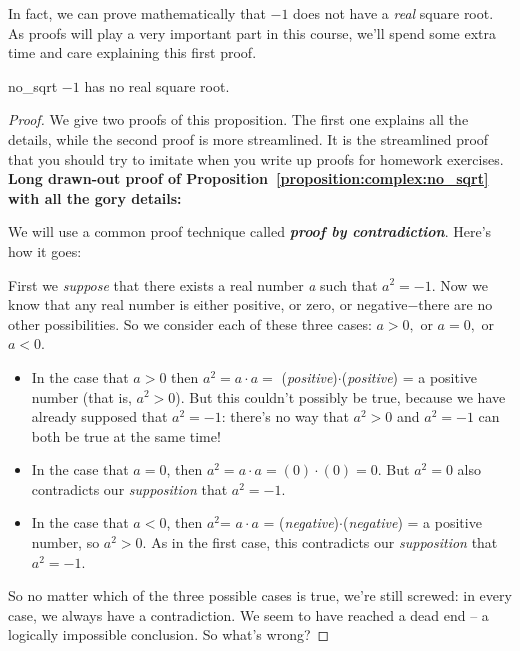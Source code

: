In fact, we can prove mathematically that $-1$ does not have a \emph{real} square root. As proofs will play a very important part in this course, we'll spend some extra time and care explaining this first proof.

\begin{prop}{no_sqrt} $-1$ has no real square root.
\end{prop}
\begin{proof}
We give two proofs of this proposition. The first one explains all
the details, while the second proof is more streamlined. It is the streamlined
proof that you should try to imitate when you write up proofs for
homework exercises.
\medskip{}
\newline
\noindent \textbf{Long drawn-out proof of Proposition~\ref{proposition:complex:no_sqrt} with all the gory details:} 

We will use a common proof technique called {\bf \emph{ proof by contradiction}}. 
Here's how it goes:

First we \emph{suppose} that there exists a real number \emph{a} such that
$a^{2}=-1$. Now we know that any real number is either positive, or zero, or negative$-$there are no other possibilities. So we consider each of these three cases: $a>0,$ or $a=0,$ or $a<0$.

\begin{itemize}
\item
In the case that $a>0$ then $a^{2}= a\cdot a =$ (\emph{positive})$\cdot$(\emph{positive})
= a positive number (that is, $a^{2}>0$). But this couldn't possibly
be true, because we have already supposed that $a^{2}=-1$: there's
no way that $a^{2}>0$ and $a^{2}=-1$ can both be true at the same
time!

\item
In the case that $a=0$, then $a^{2}=a\cdot a = (0)\cdot(0)
= 0$. But $a^{2}=0$ also contradicts our \emph{supposition} that $a^{2}=-1$.
\item
In the case that $a<0$, then $a^{2}$= $a\cdot a$ = (\emph{negative})$\cdot$(\emph{negative})
= a positive number, so $a^{2}>0$. As in the first case, this contradicts
our \emph{supposition} that $a^{2}=-1$.
\end{itemize}

So no matter which of the three possible cases is true, we're still
screwed: in every case, we always have a contradiction. We seem to have reached a dead end -- a logically impossible conclusion. So what's wrong?


\end{proof}
